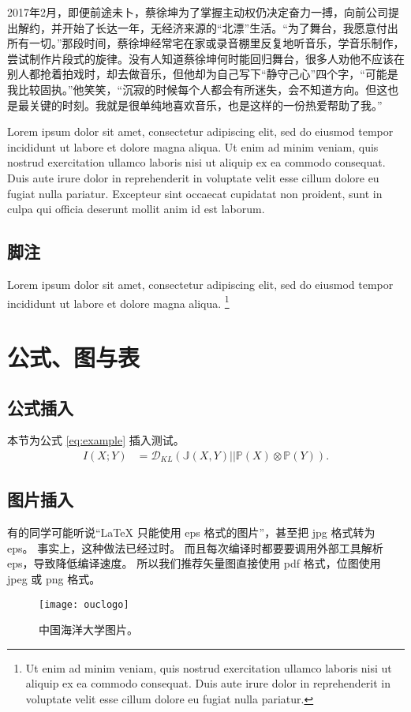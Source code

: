 \documentclass[pdf,count]{oucthesis}
\begin{document}
2017年2月，即便前途未卜，蔡徐坤为了掌握主动权仍决定奋力一搏，向前公司提出解约，并开始了长达一年，无经济来源的“北漂”生活。“为了舞台，我愿意付出所有一切。”那段时间，蔡徐坤经常宅在家或录音棚里反复地听音乐，学音乐制作，尝试制作片段式的旋律。没有人知道蔡徐坤何时能回归舞台，很多人劝他不应该在别人都抢着拍戏时，却去做音乐，但他却为自己写下“静守己心”四个字，“可能是我比较固执。”他笑笑，“沉寂的时候每个人都会有所迷失，会不知道方向。但这也是最关键的时刻。我就是很单纯地喜欢音乐，也是这样的一份热爱帮助了我。”

Lorem ipsum dolor sit amet, consectetur adipiscing elit, sed do eiusmod tempor
incididunt ut labore et dolore magna aliqua.
Ut enim ad minim veniam, quis nostrud exercitation ullamco laboris nisi ut
aliquip ex ea commodo consequat.
Duis aute irure dolor in reprehenderit in voluptate velit esse cillum dolore eu
fugiat nulla pariatur.
Excepteur sint occaecat cupidatat non proident, sunt in culpa qui officia
deserunt mollit anim id est laborum.

\section{脚注}

Lorem ipsum dolor sit amet, consectetur adipiscing elit, sed do eiusmod tempor
incididunt ut labore et dolore magna aliqua.
\footnote{Ut enim ad minim veniam, quis nostrud exercitation ullamco laboris
  nisi ut aliquip ex ea commodo consequat.
  Duis aute irure dolor in reprehenderit in voluptate velit esse cillum dolore
  eu fugiat nulla pariatur.}




\chapter{公式、图与表}
\section{公式插入}
本节为公式 \ref{eq:example} 插入测试。
\begin{equation}
\begin{split}
I(X;Y)&=\mathcal{D}_{KL}(\mathbb{J}(X,Y)||\mathbb{P}(X)\otimes\mathbb{P}(Y)).
\end{split}
\label{eq:example}
\end{equation}

\section{图片插入}
有的同学可能听说“\LaTeX{} 只能使用 eps 格式的图片”，甚至把 jpg 格式转为 eps。
事实上，这种做法已经过时。
而且每次编译时都要要调用外部工具解析 eps，导致降低编译速度。
所以我们推荐矢量图直接使用 pdf 格式，位图使用 jpeg 或 png 格式。
\begin{figure*}[ht]
    \centering
	\texttt{[image: ouclogo]}
	\caption{中国海洋大学图片。}
	\label{fig:ouc}
\end{figure*}
\end{document}
